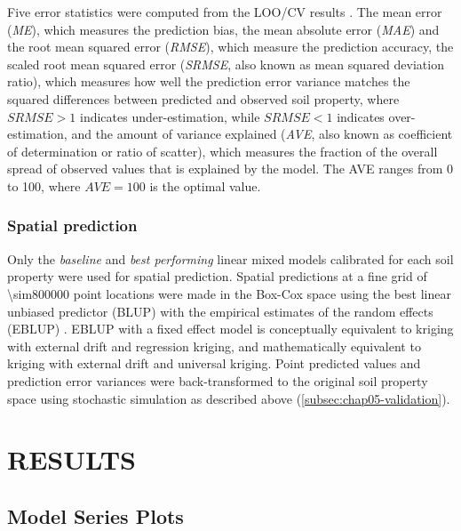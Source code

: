 Five error statistics were computed from the LOO\-/CV results \cite{JanssenEtAl1995, KempenEtAl2010, 
BrusEtAl2011}. The mean error (\textit{ME}), which measures the prediction bias, the mean absolute error 
(\textit{MAE}) and the root mean squared error (\textit{RMSE}), which measure the prediction accuracy, the 
scaled root mean squared error (\textit{SRMSE}, also known as mean squared deviation ratio), which measures 
how 
well the prediction error variance matches the squared differences between predicted and observed soil 
property, where $\textit{SRMSE} > 1$ indicates under-estimation, while $\textit{SRMSE} < 1$ indicates 
over-estimation, and the amount of variance explained (\textit{AVE}, also known as coefficient of 
determination 
or ratio of scatter), which measures the fraction of the overall spread of observed values that is explained 
by 
the model. The AVE ranges from \num{0} to \num{100}, where $\textit{AVE} = 100$ is the optimal value.

\subsubsection{Spatial prediction}
\label{subsec:chap05-prediction}

Only the \emph{baseline} and \emph{best performing} linear mixed models calibrated for each soil property were 
used for spatial prediction. Spatial predictions at a fine grid of \num{\sim800000} point locations were made 
in the Box-Cox space using the best linear unbiased predictor (BLUP) with the empirical estimates of the 
random 
effects (EBLUP) \cite{LarkEtAl2006}. EBLUP with a fixed effect model is conceptually equivalent to kriging 
with 
external drift and regression kriging, and mathematically equivalent to kriging with external drift and 
universal kriging. Point predicted values and prediction error variances were back-transformed to the original 
soil property space using stochastic simulation as described above (\autoref{subsec:chap05-validation}).

\section{RESULTS}
\label{sec:chap05-results}

\subsection{Model Series Plots}

